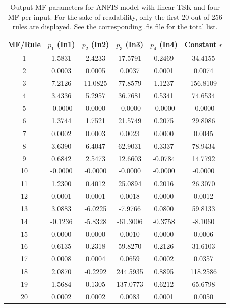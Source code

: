 \documentclass[12pt]{article}
\begin{document}
\begin{table}[H]
\centering
\begin{tabular}{|c|c|c|c|c|c|}
\hline
\textbf{MF/Rule} & \textbf{$p_1$ (In1)} & \textbf{$p_2$ (In2)} & \textbf{$p_3$ (In3)} & \textbf{$p_4$ (In4)} & \textbf{Constant $r$} \\ \hline
1 & 1.5831 & 2.4233 & 17.5791 & 0.2469 & 34.4155 \\ \hline
2 & 0.0003 & 0.0005 & 0.0037 & 0.0001 & 0.0074 \\ \hline
3 & 7.2126 & 11.0825 & 77.8579 & 1.1237 & 156.8109 \\ \hline
4 & 3.4336 & 5.2957 & 36.7681 & 0.5341 & 74.6534 \\ \hline
5 & -0.0000 & 0.0000 & -0.0000 & -0.0000 & -0.0000 \\ \hline
6 & 1.3744 & 1.7521 & 21.5749 & 0.2075 & 29.8086 \\ \hline
7 & 0.0002 & 0.0003 & 0.0023 & 0.0000 & 0.0045 \\ \hline
8 & 3.6390 & 6.4047 & 62.9031 & 0.3337 & 78.9434 \\ \hline
9 & 0.6842 & 2.5473 & 12.6603 & -0.0784 & 14.7792 \\ \hline
10 & -0.0000 & -0.0000 & -0.0000 & -0.0000 & -0.0000 \\ \hline
11 & 1.2300 & 0.4012 & 25.0894 & 0.2016 & 26.3070 \\ \hline
12 & 0.0001 & 0.0001 & 0.0018 & 0.0000 & 0.0012 \\ \hline
13 & 3.0883 & -6.0225 & -7.9766 & 0.0800 & 59.8133 \\ \hline
14 & -0.1236 & -5.8328 & -61.3006 & -0.3758 & -8.1060 \\ \hline
15 & 0.0000 & 0.0000 & 0.0010 & 0.0000 & 0.0006 \\ \hline
16 & 0.6135 & 0.2318 & 59.8270 & 0.2126 & 31.6103 \\ \hline
17 & 0.0008 & 0.0004 & 0.0659 & 0.0002 & 0.0357 \\ \hline
18 & 2.0870 & -0.2292 & 244.5935 & 0.8895 & 118.2586 \\ \hline
19 & 1.5684 & 0.1305 & 137.0773 & 0.6212 & 65.6798 \\ \hline
20 & 0.0002 & 0.0002 & 0.0083 & 0.0001 & 0.0050 \\ \hline
\end{tabular}
\label{tab:tsk_linear_params_sample}
\caption{Output MF parameters for ANFIS model with linear TSK and four MF per input. 
For the sake of readability, only the first 20 out of 256 rules are displayed. 
See the corresponding .fis file for the total list. }
\end{table}
\end{document}
